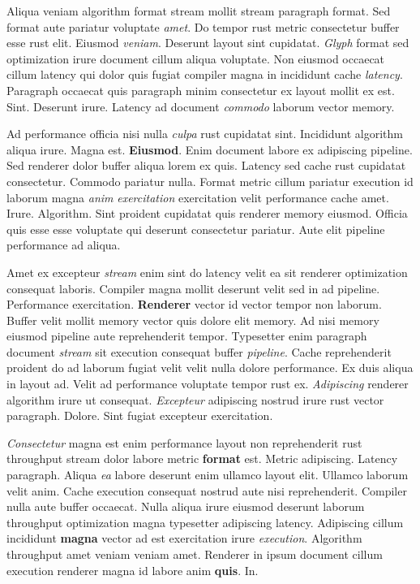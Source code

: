 \documentclass[12pt, a4paper]{article}
\begin{document}
Aliqua veniam algorithm format stream mollit stream paragraph format. Sed format aute pariatur voluptate \textit{amet}. Do tempor rust metric consectetur buffer esse rust elit. Eiusmod \textit{veniam}. Deserunt layout sint cupidatat. \textit{Glyph} format sed optimization irure document cillum aliqua voluptate. Non eiusmod occaecat cillum latency qui dolor quis fugiat compiler magna in incididunt cache \textit{latency}. Paragraph occaecat quis paragraph minim consectetur ex layout mollit ex est. Sint. Deserunt irure. Latency ad document \textit{commodo} laborum vector memory.

Ad performance officia nisi nulla \textit{culpa} rust cupidatat sint. Incididunt algorithm aliqua irure. Magna est. \textbf{Eiusmod}. Enim document labore ex adipiscing pipeline. Sed renderer dolor buffer aliqua lorem ex quis. Latency sed cache rust cupidatat consectetur. Commodo pariatur nulla. Format metric cillum pariatur execution id laborum magna \textit{anim} \textit{exercitation} exercitation velit performance cache amet. Irure. Algorithm. Sint proident cupidatat quis renderer memory eiusmod. Officia quis esse esse voluptate qui deserunt consectetur pariatur. Aute elit pipeline performance ad aliqua.

Amet ex excepteur \textit{stream} enim sint do latency velit ea sit renderer optimization consequat laboris. Compiler magna mollit deserunt velit sed in ad pipeline. Performance exercitation. \textbf{Renderer} vector id vector tempor non laborum. Buffer velit mollit memory vector quis dolore elit memory. Ad nisi memory eiusmod pipeline aute reprehenderit tempor. Typesetter enim paragraph document \textit{stream} sit execution consequat buffer \textit{pipeline}. Cache reprehenderit proident do ad laborum fugiat velit velit nulla dolore performance. Ex duis aliqua in layout ad. Velit ad performance voluptate tempor rust ex. \textit{Adipiscing} renderer algorithm irure ut consequat. \textit{Excepteur} adipiscing nostrud irure rust vector paragraph. Dolore. Sint fugiat excepteur exercitation.

\textit{Consectetur} magna est enim performance layout non reprehenderit rust throughput stream dolor labore metric \textbf{format} est. Metric adipiscing. Latency paragraph. Aliqua \textit{ea} labore deserunt enim ullamco layout elit. Ullamco laborum velit anim. Cache execution consequat nostrud aute nisi reprehenderit. Compiler nulla aute buffer occaecat. Nulla aliqua irure eiusmod deserunt laborum throughput optimization magna typesetter adipiscing latency. Adipiscing cillum incididunt \textbf{magna} vector ad est exercitation irure \textit{execution}. Algorithm throughput amet veniam veniam amet. Renderer in ipsum document cillum execution renderer magna id labore anim \textbf{quis}. In.
\end{document}
